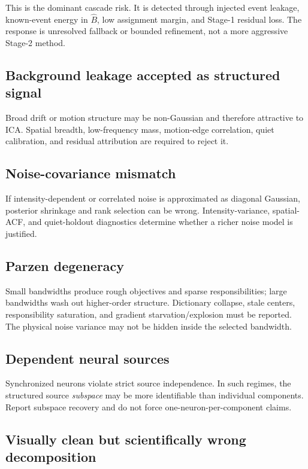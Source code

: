 \documentclass[11pt]{article}
\newcommand{\Bhat}{\widehat B}
\begin{document}
This is the dominant cascade risk. It is detected through injected event leakage,
known-event energy in \(\Bhat\), low assignment margin, and Stage-1 residual loss.
The response is unresolved fallback or bounded refinement, not a more aggressive
Stage-2 method.

\subsection{Background leakage accepted as structured signal}

Broad drift or motion structure may be non-Gaussian and therefore attractive to
ICA. Spatial breadth, low-frequency mass, motion-edge correlation, quiet
calibration, and residual attribution are required to reject it.

\subsection{Noise-covariance mismatch}

If intensity-dependent or correlated noise is approximated as diagonal Gaussian,
posterior shrinkage and rank selection can be wrong. Intensity-variance,
spatial-ACF, and quiet-holdout diagnostics determine whether a richer noise model
is justified.

\subsection{Parzen degeneracy}

Small bandwidths produce rough objectives and sparse responsibilities; large
bandwidths wash out higher-order structure. Dictionary collapse, stale centers,
responsibility saturation, and gradient starvation/explosion must be reported.
The physical noise variance may not be hidden inside the selected bandwidth.

\subsection{Dependent neural sources}

Synchronized neurons violate strict source independence. In such regimes, the
structured source \emph{subspace} may be more identifiable than individual
components. Report subspace recovery and do not force one-neuron-per-component
claims.

\subsection{Visually clean but scientifically wrong decomposition}
\end{document}
